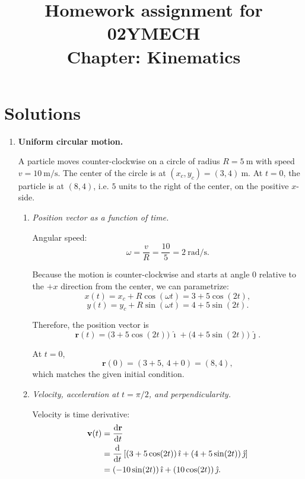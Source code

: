 \documentclass[12pt]{article}
\title{Homework assignment for 02YMECH \\ Chapter: Kinematics}
\date{}
\begin{document}
\maketitle

\vspace*{-2cm}

\section*{Solutions}

\begin{enumerate}

\item \textbf{Uniform circular motion.}

A particle moves counter-clockwise on a circle of radius $R = 5~\text{m}$ with speed $v = 10~\text{m/s}$. The center of the circle is at $(x_c, y_c) = (3,4)~\text{m}$. At $t=0$, the particle is at $(8,4)$, i.e. $5$ units to the right of the center, on the positive $x$-side.

\begin{enumerate}
    \item \textit{Position vector as a function of time.}

    Angular speed:
    \[
    \omega = \frac{v}{R} = \frac{10}{5} = 2~\text{rad/s}.
    \]

    Because the motion is counter-clockwise and starts at angle $0$ relative to the $+x$ direction from the center, we can parametrize:
    \[
    x(t) = x_c + R \cos(\omega t) = 3 + 5\cos(2t),
    \]
    \[
    y(t) = y_c + R \sin(\omega t) = 4 + 5\sin(2t).
    \]

    Therefore, the position vector is
    \[
    \mathbf{r}(t)
    = \big(3 + 5\cos(2t)\big)\,\hat{\imath}
    + \big(4 + 5\sin(2t)\big)\,\hat{\jmath}.
    \]

    At $t=0$,
    \[
    \mathbf{r}(0)
    = (3+5,\,4+0)
    = (8,4),
    \]
    which matches the given initial condition.

    \item \textit{Velocity, acceleration at $t=\pi/2$, and perpendicularity.}

    Velocity is time derivative:
    \begin{align*}
    \mathbf{v}(t)
    &= \dv{\mathbf{r}}{t} \\
    &= \dv{t}\left[(3 + 5\cos(2t))\,\hat{\imath}
    + (4 + 5\sin(2t))\,\hat{\jmath}\right] \\
    &= (-10\sin(2t))\,\hat{\imath}
    + (10\cos(2t))\,\hat{\jmath}.
    \end{align*}


\end{enumerate}
\end{enumerate}
\end{document}
